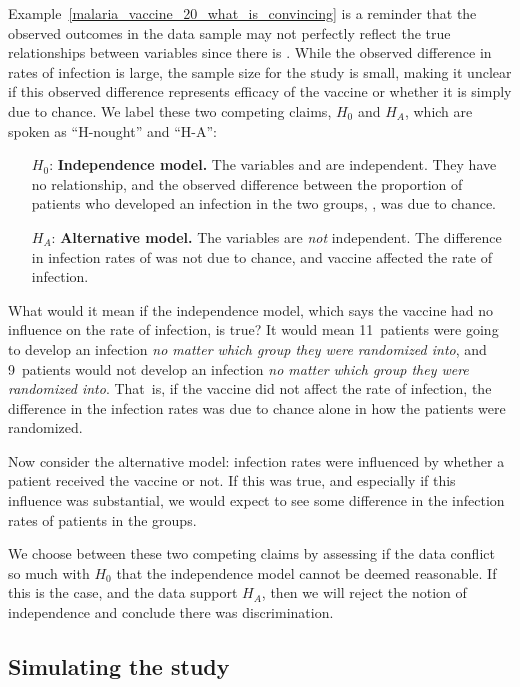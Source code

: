 Example~\ref{malaria_vaccine_20_what_is_convincing}
is a reminder that the observed outcomes in the data
sample may not perfectly reflect the true relationships
between variables since there is .
While the observed difference in rates of infection
is large, the sample size for the study is small,
making it unclear if this observed difference represents
efficacy of the vaccine or whether it is simply due to
chance.
We label these two competing claims, $H_0$ and $H_A$,
which are spoken as ``H-nought'' and ``H-A'':
\begin{itemize}
\setlength{\itemsep}{0mm}
\item[$H_0$:] \textbf{Independence model.}
    The variables  and 
    are independent.
    They have no relationship, and the observed difference
    between the proportion of patients who developed
    an infection in the two groups, \malariaIRDiffPerc{},
    was due to chance.
\item[$H_A$:] \textbf{Alternative model.}
    The variables are \emph{not} independent.
    The difference in infection rates of
    \malariaIRDiffPerc{}
    was not due to chance,
    and vaccine affected the rate of infection.
\end{itemize}

What would it mean if the independence model,
which says the vaccine had no influence on the
rate of infection, is true?
It would mean 11~patients were going to
develop an infection \emph{no matter which group
they were randomized into},
and 9~patients would not develop an infection
\emph{no matter which group they were randomized
into}.
That~is, if the vaccine did not affect the rate
of infection, the difference in the infection rates
was due to chance alone in how the patients were
randomized.

Now consider the alternative model:
infection rates were influenced by whether a patient
received the vaccine or not.
If this was true, and especially if this influence
was substantial, we would expect to see some difference
in the infection rates of patients in the groups.

We choose between these two competing claims
by assessing if the data conflict so much with
$H_0$ that the independence model cannot be deemed
reasonable.
If this is the case, and the data support $H_A$,
then we will reject the notion of independence
and conclude there was discrimination.


\D{\newpage}

%
\subsection{Simulating the study}
\label{simulatingTheStudy}

